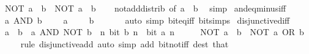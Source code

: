 \begin{isabellebody}
\ \ {\isacartoucheopen}NOT\ {\isacharparenleft}{\kern0pt}a\ {\isacharminus}{\kern0pt}\ b{\isacharparenright}{\kern0pt}\ {\isacharequal}{\kern0pt}\ NOT\ a\ {\isacharplus}{\kern0pt}\ b{\isacartoucheclose}\isanewline
%
\isadelimproof
\ \ %
\endisadelimproof
%
\isatagproof
{}\isamarkupfalse%
\ not{\isacharunderscore}{\kern0pt}add{\isacharunderscore}{\kern0pt}distrib\ {\isacharbrackleft}{\kern0pt}of\ a\ {\isacartoucheopen}{\isacharminus}{\kern0pt}\ b{\isacartoucheclose}{\isacharbrackright}{\kern0pt}\ \isamarkupfalse%
\ simp%
\endisatagproof
{\isafoldproof}%
%
\isadelimproof
\isanewline
%
\endisadelimproof
\isanewline
{}\isamarkupfalse%
\ and{\isacharunderscore}{\kern0pt}eq{\isacharunderscore}{\kern0pt}minus{\isacharunderscore}{\kern0pt}{}{\isacharunderscore}{\kern0pt}iff{\isacharcolon}{\kern0pt}\isanewline
\ \ {\isacartoucheopen}a\ AND\ b\ {\isacharequal}{\kern0pt}\ {\isacharminus}{\kern0pt}\ {}\ {\isasymlongleftrightarrow}\ a\ {\isacharequal}{\kern0pt}\ {\isacharminus}{\kern0pt}\ {}\ {\isasymand}\ b\ {\isacharequal}{\kern0pt}\ {\isacharminus}{\kern0pt}\ {}{\isacartoucheclose}\isanewline
%
\isadelimproof
\ \ %
\endisadelimproof
%
\isatagproof
{}\isamarkupfalse%
\ {\isacharparenleft}{\kern0pt}auto\ simp{\isacharcolon}{\kern0pt}\ bit{\isacharunderscore}{\kern0pt}eq{\isacharunderscore}{\kern0pt}iff\ bit{\isacharunderscore}{\kern0pt}simps{\isacharparenright}{\kern0pt}%
\endisatagproof
{\isafoldproof}%
%
\isadelimproof
\isanewline
%
\endisadelimproof
\isanewline
{}\isamarkupfalse%
\ disjunctive{\isacharunderscore}{\kern0pt}diff{\isacharcolon}{\kern0pt}\isanewline
\ \ {\isacartoucheopen}a\ {\isacharminus}{\kern0pt}\ b\ {\isacharequal}{\kern0pt}\ a\ AND\ NOT\ b{\isacartoucheclose}\ \ {\isacartoucheopen}{\isasymAnd}n{\isachardot}{\kern0pt}\ bit\ b\ n\ {\isasymLongrightarrow}\ bit\ a\ n{\isacartoucheclose}\isanewline
%
\isadelimproof
%
\endisadelimproof
%
\isatagproof
{}\isamarkupfalse%
\ {\isacharminus}{\kern0pt}\isanewline
\ \ \isamarkupfalse%
\ {\isacartoucheopen}NOT\ a\ {\isacharplus}{\kern0pt}\ b\ {\isacharequal}{\kern0pt}\ NOT\ a\ OR\ b{\isacartoucheclose}\isanewline
\ \ \ \ \isamarkupfalse%
\ {\isacharparenleft}{\kern0pt}rule\ disjunctive{\isacharunderscore}{\kern0pt}add{\isacharparenright}{\kern0pt}\ {\isacharparenleft}{\kern0pt}auto\ simp\ add{\isacharcolon}{\kern0pt}\ bit{\isacharunderscore}{\kern0pt}not{\isacharunderscore}{\kern0pt}iff\ dest{\isacharcolon}{\kern0pt}\ that{\isacharparenright}{\kern0pt}\isanewline

\end{isabellebody}
